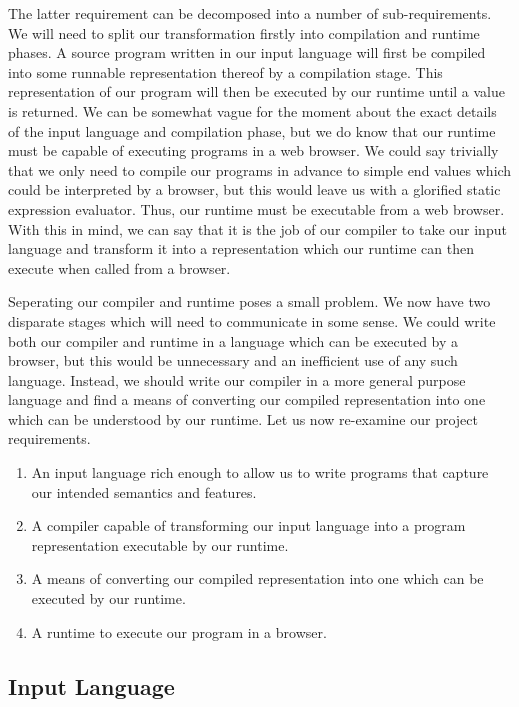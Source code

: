 \documentclass[11pt]{article}
\begin{document}
\noindent The latter requirement can be decomposed into a number of sub-requirements.
We will need to split our transformation firstly into compilation and runtime phases.
A source program written in our input language will first be compiled into some runnable
representation thereof by a compilation stage. This representation of our program will
then be executed by our runtime until a value is returned. We can be somewhat vague
for the moment about the exact details of the input language and compilation phase, 
but we do know that our runtime must be capable of executing programs in a web browser.
We could say trivially that we only need to compile our programs in advance to simple
end values which could be interpreted by a browser, but this would leave us with a 
glorified static expression evaluator. Thus, our runtime must be executable from a
web browser. With this in mind, we can say that it is the job of our compiler to
take our input language and transform it into a representation which our runtime can
then execute when called from a browser. 

Seperating our compiler and runtime poses a small problem. We now have two disparate
stages which will need to communicate in some sense. We could write both our compiler
and runtime in a language which can be executed by a browser, but this would be 
unnecessary and an inefficient use of any such language. Instead, we should write our
compiler in a more general purpose language and find a means of converting our compiled
representation into one which can be understood by our runtime. Let us now re-examine
our project requirements.

\begin{enumerate}
	\item An input language rich enough to allow us to write programs
		  that capture our intended semantics and features.
	\item A compiler capable of transforming our input language into
		  a program representation executable by our runtime.
	\item A means of converting our compiled representation into one
		  which can be executed by our runtime.
	\item A runtime to execute our program in a browser. 
\end{enumerate}

\subsection{Input Language}
\end{document}
